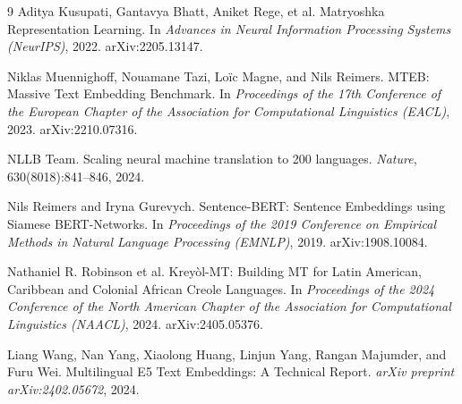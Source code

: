 \documentclass[11pt]{article}
\begin{document}
\begin{thebibliography}{9}
Aditya Kusupati, Gantavya Bhatt, Aniket Rege, et al.
\newblock Matryoshka Representation Learning.
\newblock In \emph{Advances in Neural Information Processing Systems (NeurIPS)}, 2022.
arXiv:2205.13147.

Niklas Muennighoff, Nouamane Tazi, Lo\"{i}c Magne, and Nils Reimers.
\newblock MTEB: Massive Text Embedding Benchmark.
\newblock In \emph{Proceedings of the 17th Conference of the European Chapter of the Association for
Computational Linguistics (EACL)}, 2023. arXiv:2210.07316.

NLLB Team.
\newblock Scaling neural machine translation to 200 languages.
\newblock \emph{Nature}, 630(8018):841--846, 2024.

Nils Reimers and Iryna Gurevych.
\newblock Sentence-BERT: Sentence Embeddings using Siamese BERT-Networks.
\newblock In \emph{Proceedings of the 2019 Conference on Empirical Methods in Natural Language
Processing (EMNLP)}, 2019. arXiv:1908.10084.

Nathaniel R. Robinson et al.
\newblock Krey\`{o}l-MT: Building MT for Latin American, Caribbean and Colonial African Creole
Languages.
\newblock In \emph{Proceedings of the 2024 Conference of the North American Chapter of the
Association for Computational Linguistics (NAACL)}, 2024. arXiv:2405.05376.

Liang Wang, Nan Yang, Xiaolong Huang, Linjun Yang, Rangan Majumder, and Furu Wei.
\newblock Multilingual E5 Text Embeddings: A Technical Report.
\newblock \emph{arXiv preprint arXiv:2402.05672}, 2024.

\end{thebibliography}
\end{document}
